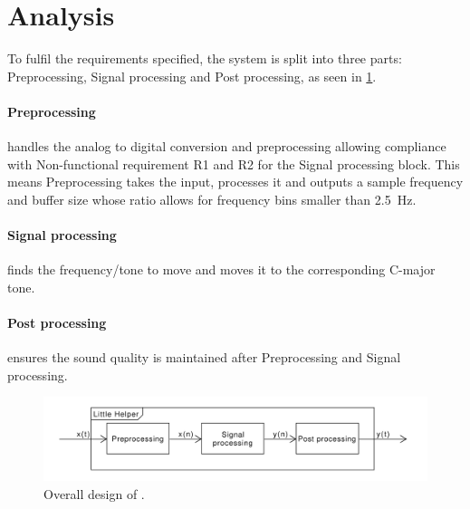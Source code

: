 
\section{Analysis}

To fulfil the requirements specified, the system is split into three parts: Preprocessing, Signal processing and Post processing, as seen in \cref{fig:overalldesign}.

\paragraph{Preprocessing} handles the analog to digital conversion and preprocessing allowing compliance with Non-functional requirement R1 and R2 for the Signal processing block.
This means Preprocessing takes the input, processes it and outputs a sample frequency and buffer size whose ratio allows for frequency bins smaller than \SI{2.5}{\hertz}.

\paragraph{Signal processing} finds the frequency/tone to move and moves it to the corresponding C-major tone.

\paragraph{Post processing} ensures the sound quality is maintained after Preprocessing and Signal processing.

\begin{figure}
	\centering
	\includegraphics[width=1\linewidth]{gfx/Design/OverallDesign.pdf}
	\caption{Overall design of \systemName.}
	\label{fig:overalldesign}
\end{figure}
